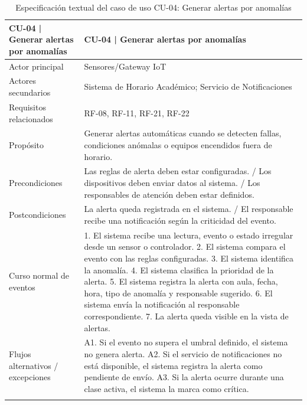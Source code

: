 \begingroup
\small
\begin{longtable}{|P{0.5000}|P{0.5000}|}
\hline
CU-04 | Generar alertas por anomalías & CU-04 | Generar alertas por anomalías \\ \hline
Actor principal & Sensores/Gateway IoT \\ \hline
Actores secundarios & Sistema de Horario Académico; Servicio de Notificaciones \\ \hline
Requisitos relacionados & RF-08, RF-11, RF-21, RF-22 \\ \hline
Propósito & Generar alertas automáticas cuando se detecten fallas, condiciones anómalas o equipos encendidos fuera de horario. \\ \hline
Precondiciones & Las reglas de alerta deben estar configuradas. / Los dispositivos deben enviar datos al sistema. / Los responsables de atención deben estar definidos. \\ \hline
Postcondiciones & La alerta queda registrada en el sistema. / El responsable recibe una notificación según la criticidad del evento. \\ \hline
Curso normal de eventos & 1. El sistema recibe una lectura, evento o estado irregular desde un sensor o controlador. 2. El sistema compara el evento con las reglas configuradas. 3. El sistema identifica la anomalía. 4. El sistema clasifica la prioridad de la alerta. 5. El sistema registra la alerta con aula, fecha, hora, tipo de anomalía y responsable sugerido. 6. El sistema envía la notificación al responsable correspondiente. 7. La alerta queda visible en la vista de alertas. \\ \hline
Flujos alternativos / excepciones & A1. Si el evento no supera el umbral definido, el sistema no genera alerta. A2. Si el servicio de notificaciones no está disponible, el sistema registra la alerta como pendiente de envío. A3. Si la alerta ocurre durante una clase activa, el sistema la marca como crítica. \\ \hline
\caption{Especificación textual del caso de uso CU-04: Generar alertas por anomalías}
\end{longtable}
\endgroup

